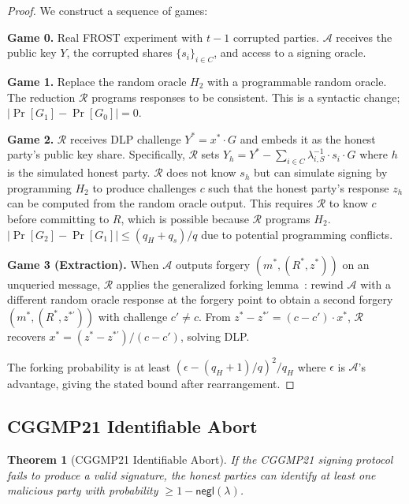 \documentclass[11pt,twocolumn]{article}
\newtheorem{theorem}{Theorem}[section]
\begin{document}
\begin{proof}
We construct a sequence of games:

\textbf{Game 0.} Real FROST experiment with $t-1$ corrupted parties. $\mathcal{A}$
receives the public key $Y$, the corrupted shares $\{s_i\}_{i \in C}$, and access
to a signing oracle.

\textbf{Game 1.} Replace the random oracle $H_2$ with a programmable random oracle.
The reduction $\mathcal{R}$ programs responses to be consistent. This is a syntactic
change; $|\Pr[G_1] - \Pr[G_0]| = 0$.

\textbf{Game 2.} $\mathcal{R}$ receives DLP challenge $Y^* = x^* \cdot G$ and
embeds it as the honest party's public key share. Specifically, $\mathcal{R}$ sets
$Y_h = Y^* - \sum_{i \in C} \lambda_{i,S}^{-1} \cdot s_i \cdot G$ where $h$ is
the simulated honest party. $\mathcal{R}$ does not know $s_h$ but can simulate
signing by programming $H_2$ to produce challenges $c$ such that the honest party's
response $z_h$ can be computed from the random oracle output. This requires
$\mathcal{R}$ to know $c$ before committing to $R$, which is possible because
$\mathcal{R}$ programs $H_2$. $|\Pr[G_2] - \Pr[G_1]| \leq (q_H + q_s)/q$ due
to potential programming conflicts.

\textbf{Game 3 (Extraction).} When $\mathcal{A}$ outputs forgery $(m^*, (R^*, z^*))$
on an unqueried message, $\mathcal{R}$ applies the generalized forking
lemma~\cite{bellare2006}: rewind $\mathcal{A}$ with a different random oracle
response at the forgery point to obtain a second forgery $(m^*, (R^*, z^{*\prime}))$
with challenge $c' \neq c$. From $z^* - z^{*\prime} = (c - c') \cdot x^*$,
$\mathcal{R}$ recovers $x^* = (z^* - z^{*\prime}) / (c - c')$, solving DLP.

The forking probability is at least $(\epsilon - (q_H+1)/q)^2 / q_H$ where $\epsilon$
is $\mathcal{A}$'s advantage, giving the stated bound after rearrangement.
\end{proof}

\subsection{CGGMP21 Identifiable Abort}

\begin{theorem}[CGGMP21 Identifiable Abort]
\label{thm:cggmp-ia}
If the CGGMP21 signing protocol fails to produce a valid signature, the honest parties
can identify at least one malicious party with probability $\geq 1 - \mathsf{negl}(\lambda)$.
\end{theorem}
\end{document}
